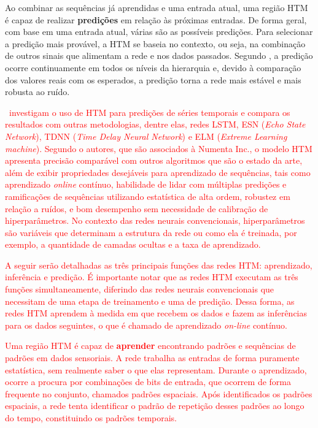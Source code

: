 Ao combinar as sequências já aprendidas e uma entrada atual, uma região HTM é capaz de realizar \textbf{predições} em relação às próximas entradas. De forma geral, com base em uma entrada atual, várias são as possíveis predições. Para selecionar a predição mais provável, a HTM se baseia no contexto, ou seja, na combinação de outros sinais que alimentam a rede e nos dados passados. Segundo \numenta, a predição ocorre continuamente em todos os níveis da hierarquia e, devido à comparação dos valores reais com os esperados, a predição torna a rede mais estável e mais robusta ao ruído.

\textcolor{red}{\cui \ investigam o uso de HTM para predições de séries temporais e compara os resultados com outras metodologias, dentre elas, redes LSTM, ESN (\textit{Echo State Network}), TDNN (\textit{Time Delay Neural Network}) e ELM (\textit{Extreme Learning machine}). Segundo o autores, que são associados à Numenta Inc., o modelo HTM apresenta precisão comparável com outros algoritmos que são o estado da arte, além de exibir propriedades desejáveis para aprendizado de sequências, tais como aprendizado \textit{online} contínuo, habilidade de lidar com múltiplas predições e ramificações de sequências utilizando estatística de alta ordem, robustez em relação a ruídos, e bom desempenho sem necessidade de calibração de hiperparâmetros. No contexto das redes neurais convencionais, hiperparâmetros são variáveis que determinam a estrutura da rede ou como ela é treinada, por exemplo, a quantidade de camadas ocultas e a taxa de aprendizado.}

\textcolor{red}{A seguir serão detalhadas as três principais funções das redes HTM: aprendizado, inferência e predição. É importante notar que as redes HTM executam as três funções simultaneamente, diferindo das redes neurais convencionais que necessitam de uma etapa de treinamento e uma de predição. Dessa forma, as redes HTM aprendem à medida em que recebem os dados e fazem as inferências para os dados seguintes, o que é chamado de aprendizado \textit{on-line} contínuo.}

\textcolor{red}{Uma região HTM é capaz de \textbf{aprender} encontrando padrões e sequências de padrões em dados sensoriais. A rede trabalha as entradas de forma puramente estatística, sem realmente saber o que elas representam. Durante o aprendizado, ocorre a procura por combinações de bits de entrada, que ocorrem de forma frequente no conjunto, chamados padrões espaciais. Após identificados os padrões espaciais, a rede tenta identificar o padrão de repetição desses padrões ao longo do tempo, constituindo os padrões temporais.}

